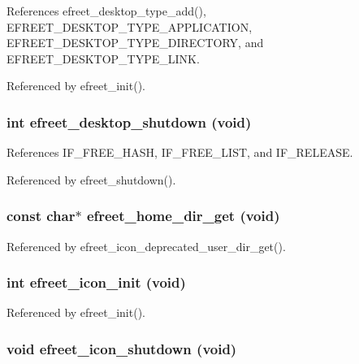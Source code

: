 References efreet\_\-desktop\_\-type\_\-add(), EFREET\_\-DESKTOP\_\-TYPE\_\-APPLICATION, EFREET\_\-DESKTOP\_\-TYPE\_\-DIRECTORY, and EFREET\_\-DESKTOP\_\-TYPE\_\-LINK.

Referenced by efreet\_\-init().
\subsubsection[efreet\_\-desktop\_\-shutdown]{\setlength{\rightskip}{0pt plus 5cm}int efreet\_\-desktop\_\-shutdown (void)}\label{group__Efreet__Private_g3ceee7a1b94528ef44e59e8b16b3806b}




References IF\_\-FREE\_\-HASH, IF\_\-FREE\_\-LIST, and IF\_\-RELEASE.

Referenced by efreet\_\-shutdown().
\subsubsection[efreet\_\-home\_\-dir\_\-get]{\setlength{\rightskip}{0pt plus 5cm}const char$\ast$ efreet\_\-home\_\-dir\_\-get (void)}\label{group__Efreet__Private_g1960613491ece03d79c687b6f471eff2}




Referenced by efreet\_\-icon\_\-deprecated\_\-user\_\-dir\_\-get().
\subsubsection[efreet\_\-icon\_\-init]{\setlength{\rightskip}{0pt plus 5cm}int efreet\_\-icon\_\-init (void)}\label{group__Efreet__Private_g9a49d6f758cf8047e8a93f4e2a938e73}




Referenced by efreet\_\-init().
\subsubsection[efreet\_\-icon\_\-shutdown]{\setlength{\rightskip}{0pt plus 5cm}void efreet\_\-icon\_\-shutdown (void)}\label{group__Efreet__Private_gff95ddb7caca44b5f8a72554a4bc7f89}




